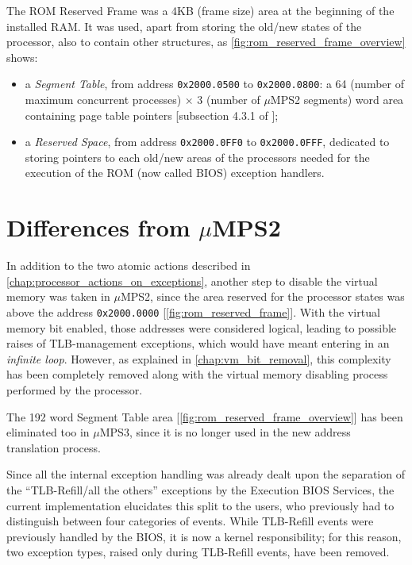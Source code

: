 \documentclass[12pt,a4paper,openright,twoside]{report}
\begin{document}
The ROM Reserved Frame was a 4KB (frame size) area at the beginning of the installed RAM.
It was used, apart from storing the old/new states of the processor, also to contain other structures, as \autoref{fig:rom_reserved_frame_overview} shows:
\begin{itemize}
	\item a \textit{Segment Table}, from address \texttt{0x2000.0500} to \texttt{0x2000.0800}: a 64 (number of maximum concurrent processes) $\times$ 3 (number of $\mu$MPS2 segments) word area containing page table pointers [subsection 4.3.1 of \cite{old_pops}];
	\item a \textit{Reserved Space}, from address \texttt{0x2000.0FF0} to \texttt{0x2000.0FFF}, dedicated to storing pointers to each old/new areas of the processors needed for the execution of the ROM (now called BIOS) exception handlers.
\end{itemize}

\section{Differences from $\mu$MPS2}
In addition to the two atomic actions described in \autoref{chap:processor_actions_on_exceptions}, another step to disable the virtual memory was taken in $\mu$MPS2, since the area reserved for the processor states was above the address \texttt{0x2000.0000} [\autoref{fig:rom_reserved_frame}].
With the virtual memory bit enabled, those addresses were considered logical, leading to possible raises of TLB-management exceptions, which would have meant entering in an \textit{infinite loop}.
However, as explained in \autoref{chap:vm_bit_removal}, this complexity has been completely removed along with the virtual memory disabling process performed by the processor.

The 192 word Segment Table area [\autoref{fig:rom_reserved_frame_overview}] has been eliminated too in $\mu$MPS3, since it is no longer used in the new address translation process.

Since all the internal exception handling was already dealt upon the separation of the ``TLB-Refill/all the others'' exceptions by the Execution BIOS Services, the current implementation elucidates this split to the users, who previously had to distinguish between four categories of events.
While TLB-Refill events were previously handled by the BIOS, it is now a kernel responsibility; for this reason, two exception types, raised only during TLB-Refill events, have been removed.
\end{document}
